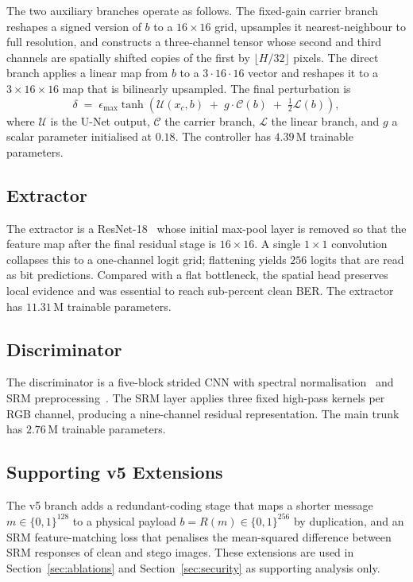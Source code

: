 \documentclass[journal]{IEEEtran}
\begin{document}
The two auxiliary branches operate as follows. The fixed-gain
carrier branch reshapes a signed version of $b$ to a
$16{\times}16$ grid, upsamples it nearest-neighbour to full
resolution, and constructs a three-channel tensor whose second and
third channels are spatially shifted copies of the first by
$\lfloor H/32\rfloor$ pixels. The direct branch applies a linear map
from $b$ to a $3\cdot16\cdot16$ vector and reshapes it to a
$3{\times}16{\times}16$ map that is bilinearly upsampled. The final
perturbation is
\begin{equation}
\delta \;=\; \epsilon_{\max}\tanh\!\left(
\mathcal{U}(x_c,b) \;+\; g\cdot\mathcal{C}(b) \;+\; \tfrac{1}{2}\mathcal{L}(b)
\right),
\end{equation}
where $\mathcal{U}$ is the U-Net output, $\mathcal{C}$ the carrier
branch, $\mathcal{L}$ the linear branch, and $g$ a scalar parameter
initialised at $0.18$. The controller has $4.39\,\mathrm{M}$
trainable parameters.

\subsection{Extractor}
The extractor is a ResNet-18~\cite{he2016deep} whose initial
max-pool layer is removed so that the feature map after the final
residual stage is $16{\times}16$. A single $1{\times}1$ convolution
collapses this to a one-channel logit grid; flattening yields $256$
logits that are read as bit predictions. Compared with a flat
bottleneck, the spatial head preserves local evidence and was
essential to reach sub-percent clean BER. The extractor has
$11.31\,\mathrm{M}$ trainable parameters.

\subsection{Discriminator}
The discriminator is a five-block strided CNN with spectral
normalisation~\cite{miyato2018spectral} and SRM
preprocessing~\cite{fridrich2012rich}. The SRM layer applies three
fixed high-pass kernels per RGB channel, producing a nine-channel
residual representation. The main trunk has $2.76\,\mathrm{M}$
trainable parameters.

\subsection{Supporting v5 Extensions}
The v5 branch adds a redundant-coding stage that maps a shorter
message $m\in\{0,1\}^{128}$ to a physical payload
$b=R(m)\in\{0,1\}^{256}$ by duplication, and an SRM feature-matching
loss that penalises the mean-squared difference between SRM
responses of clean and stego images. These extensions are used in
Section~\ref{sec:ablations} and Section~\ref{sec:security} as
supporting analysis only.
\end{document}
